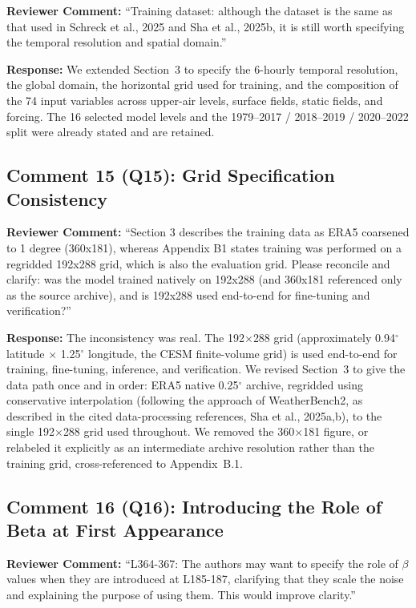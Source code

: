 \documentclass[12pt]{article}
\begin{document}
\textbf{Reviewer Comment:} ``Training dataset: although the dataset is the same as
that used in Schreck et al., 2025 and Sha et al., 2025b, it is still worth specifying
the temporal resolution and spatial domain.''

\textbf{Response:} We extended Section~3 to specify the 6-hourly temporal
resolution, the global domain, the horizontal grid used for training, and the
composition of the 74 input variables across upper-air levels, surface fields, static
fields, and forcing. The 16 selected model levels and the 1979--2017 / 2018--2019 /
2020--2022 split were already stated and are retained.

\subsection*{Comment 15 (Q15): Grid Specification Consistency}

\textbf{Reviewer Comment:} ``Section 3 describes the training data as ERA5 coarsened
to 1 degree (360x181), whereas Appendix B1 states training was performed on a
regridded 192x288 grid, which is also the evaluation grid. Please reconcile and
clarify: was the model trained natively on 192x288 (and 360x181 referenced only as
the source archive), and is 192x288 used end-to-end for fine-tuning and
verification?''

\textbf{Response:} The inconsistency was real. The 192$\times$288 grid (approximately 0.94$^\circ$ latitude $\times$
1.25$^\circ$ longitude, the CESM finite-volume grid) is used end-to-end for training,
fine-tuning, inference, and verification. We revised Section~3 to give the data
path once and in order: ERA5 native 0.25$^\circ$ archive, regridded using
conservative interpolation (following the approach of WeatherBench2, as described in
the cited data-processing references, Sha et al., 2025a,b), to the single
192$\times$288 grid used throughout. We removed the 360$\times$181 figure, or
relabeled it explicitly as an intermediate archive resolution rather than the training
grid, cross-referenced to Appendix~B.1.

\subsection*{Comment 16 (Q16): Introducing the Role of Beta at First Appearance}

\textbf{Reviewer Comment:} ``L364-367: The authors may want to specify the role of
$\beta$ values when they are introduced at L185-187, clarifying that they scale the
noise and explaining the purpose of using them. This would improve clarity.''
\end{document}
